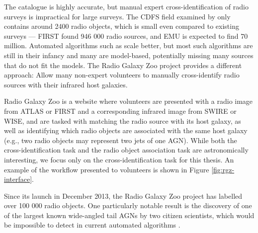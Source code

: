     The \citeauthor{norris06} catalogue is highly accurate, but manual expert
    cross-identification of radio surveys is impractical for large surveys. The
    CDFS field examined by \citeauthor{norris06} only contains around 2400 radio
    objects, which is small even compared to existing surveys --- FIRST
    \citep{becker95} found 946 000 radio sources, and EMU is expected to find 70
    million. Automated algorithms such as \citeauthor{fan15} scale better, but
    most such algorithms are still in their infancy \citeauthor{norris16} and
    many are model-based, potentially missing many sources that do not fit the
    models. The Radio Galaxy Zoo project \citep{banfield15} provides a different
    approach: Allow many non-expert volunteers to manually cross-identify radio
    sources with their infrared host galaxies.

    Radio Galaxy Zoo is a website where volunteers are presented with a radio
    image from ATLAS or FIRST and a corresponding infrared image from SWIRE or
    WISE, and are tasked with matching the radio source with its host galaxy, as
    well as identifying which radio objects are associated with the same host
    galaxy (e.g., two radio objects may represent two jets of one AGN). While
    both the cross-identification task and the radio object association task are
    astronomically interesting, we focus only on the cross-identification task
    for this thesis. An example of the workflow presented to volunteers is shown
    in Figure \ref{fig:rgz-interface}.

    Since its launch in December 2013, the Radio Galaxy Zoo project has labelled over 100 000 radio objects. One particularly notable result is the discovery of one of the largest known wide-angled tail AGNs by two citizen scientists, which would be impossible to detect in current automated algorithms \citep{banfield16}.

